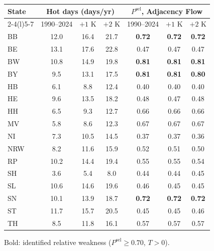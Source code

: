 \begin{tabular}{@{}lcccccc@{}}
\toprule
State & \multicolumn{3}{c}{Hot days (days/yr)} & \multicolumn{3}{c}{$P^{\mathrm{sel}}$, Adjacency Flow} \\
\cmidrule(lr){2-4}\cmidrule(l){5-7}
 & 1990--2024 & $+1$ K & $+2$ K & 1990--2024 & $+1$ K & $+2$ K \\
\midrule
BB & 12.0 & 16.4 & 21.7 & \textbf{0.72} & \textbf{0.72} & \textbf{0.72} \\
BE & 13.1 & 17.6 & 22.8 & 0.47 & 0.47 & 0.47 \\
BW & 10.8 & 14.9 & 19.8 & \textbf{0.81} & \textbf{0.81} & \textbf{0.81} \\
BY & 9.5 & 13.1 & 17.5 & \textbf{0.81} & \textbf{0.81} & \textbf{0.80} \\
HB & 6.1 & 8.8 & 12.4 & 0.40 & 0.40 & 0.40 \\
HE & 9.6 & 13.5 & 18.2 & 0.48 & 0.47 & 0.48 \\
HH & 6.5 & 9.3 & 12.7 & 0.66 & 0.66 & 0.66 \\
MV & 5.8 & 8.6 & 12.3 & 0.67 & 0.67 & 0.67 \\
NI & 7.3 & 10.5 & 14.5 & 0.37 & 0.37 & 0.36 \\
NRW & 8.2 & 11.6 & 15.9 & 0.52 & 0.51 & 0.50 \\
RP & 10.2 & 14.4 & 19.4 & 0.55 & 0.55 & 0.54 \\
SH & 3.6 & 5.4 & 8.0 & 0.44 & 0.44 & 0.45 \\
SL & 10.6 & 14.6 & 19.6 & 0.46 & 0.45 & 0.45 \\
SN & 10.1 & 13.9 & 18.7 & \textbf{0.72} & \textbf{0.72} & \textbf{0.72} \\
ST & 11.7 & 15.7 & 20.5 & 0.45 & 0.45 & 0.46 \\
TH & 8.5 & 11.8 & 16.1 & 0.57 & 0.57 & 0.57 \\
\bottomrule
\end{tabular}
\par\smallskip\raggedright\scriptsize Bold: identified relative weakness ($P^{\mathrm{sel}}\ge0.70$, $T>0$).

